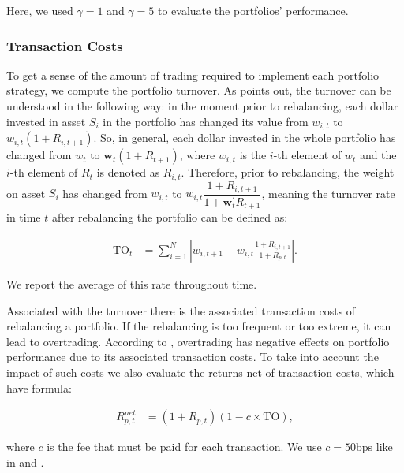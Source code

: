 \documentclass[12pt,oneside,a4paper]{memoir}
\begin{document}
\noindent
Here, we used $\gamma=1$ and $\gamma=5$ to evaluate the portfolios' performance.

\subsubsection*{Transaction Costs}

To get a sense of the amount of trading required to implement each portfolio strategy, we compute the portfolio turnover. As  points out, the turnover can be understood in the following way: in the moment prior to rebalancing, each dollar invested in asset $S_{i}$ in the portfolio has changed its value from $w_{i,t}$ to $w_{i,t}(1+R_{i,t+1})$. So, in general, each dollar invested in the whole portfolio has changed from $w_{t}$ to $\mathbf{w}_{t}(1+R_{t+1})$, where $w_{i,t}$ is the $i$-th element of $w_{t}$ and the $i$-th element of $R_{t}$ is denoted as $R_{i,t}$. Therefore, prior to rebalancing, the weight on asset $S_{i}$ has changed from $w_{i,t}$ to $w_{i,t}\dfrac{1+R_{i,t+1}}{1+\mathbf{w}_{t}^{\prime}R_{t+1}}$, meaning the turnover rate in time $t$ after rebalancing the portfolio can be defined as:

\vspace{-18 pt}
\begin{align*}	\label{to}
\mathrm{TO}_{t} &=
\sum_{i=1}^{N} \left|w_{i, t+1} - w_{i,t}\frac{1+R_{i,t+1}}{1+R_{p,t}}\right|.
\end{align*}

\noindent
We report the average of this rate throughout time.

Associated with the turnover there is the associated transaction costs of rebalancing a portfolio.
If the rebalancing is too frequent or too extreme, it can lead to overtrading.
According to , overtrading has negative effects on portfolio performance due to its associated transaction costs.
To take into account the impact of such costs we also evaluate the returns net of transaction costs, which have formula:

\vspace{-18 pt}
\begin{align*}
	R^{net}_{p,t} &= (1 + R_{p,t} )(1 - c\times \mathrm{TO}),
\end{align*}

\noindent
where $c$ is the fee that must be paid for each transaction. We use $c=50\mathrm{bps}$ like in  and .
\end{document}
